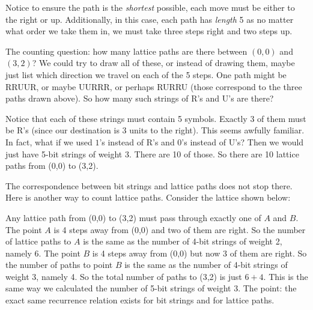 \documentclass[12pt]{article}
\begin{document}
Notice to ensure the path is the {\em shortest} possible, each move must be either to the right or up.  Additionally, in this case, each path has {\em length} 5 as no matter what order we take them in, we must take three steps right and two steps up.

The counting question: how many lattice paths are there between $(0,0)$ and $(3,2)$?  We could try to draw all of these, or instead of drawing them, maybe just list which direction we travel on each of the 5 steps.  One path might be RRUUR, or maybe UURRR, or perhaps RURRU (those correspond to the three paths drawn above).  So how many such strings of R's and U's are there?  

Notice that each of these strings must contain 5 symbols.  Exactly 3 of them must be R's (since our destination is 3 units to the right).  This seems awfully familiar.  In fact, what if we used $1$'s instead of R's and 0's instead of U's?  Then we would just have 5-bit strings of weight 3.  There are 10 of those.  So there are 10 lattice paths from (0,0) to (3,2). 

The correspondence between bit strings and lattice paths does not stop there.  Here is another way to count lattice paths.  Consider the lattice shown below:

  \begin{center}

  \end{center}

Any lattice path from (0,0) to (3,2) must pass through exactly one of $A$ and $B$.  The point $A$ is 4 steps away from (0,0) and two of them are right.  So the number of lattice paths to $A$ is the same as the number of 4-bit strings of weight 2, namely 6.  The point $B$ is 4 steps away from (0,0) but now 3 of them are right.  So the number of paths to point $B$ is the same as the number of 4-bit strings of weight 3, namely 4.  So the total number of paths to (3,2) is just $6+4$.  This is the same way we calculated the number of 5-bit strings of weight 3.  The point: the exact same recurrence relation exists for bit strings and for lattice paths.
\end{document}
